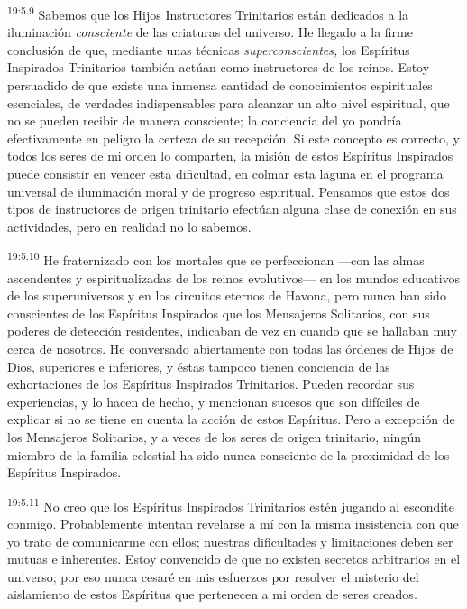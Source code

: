 \par
\textsuperscript{19:5.9} Sabemos que los Hijos Instructores Trinitarios están dedicados a la iluminación \textit{consciente} de las criaturas del universo. He llegado a la firme conclusión de que, mediante unas técnicas \textit{superconscientes,} los Espíritus Inspirados Trinitarios también actúan como instructores de los reinos. Estoy persuadido de que existe una inmensa cantidad de conocimientos espirituales esenciales, de verdades indispensables para alcanzar un alto nivel espiritual, que no se pueden recibir de manera consciente; la conciencia del yo pondría efectivamente en peligro la certeza de su recepción. Si este concepto es correcto, y todos los seres de mi orden lo comparten, la misión de estos Espíritus Inspirados puede consistir en vencer esta dificultad, en colmar esta laguna en el programa universal de iluminación moral y de progreso espiritual. Pensamos que estos dos tipos de instructores de origen trinitario efectúan alguna clase de conexión en sus actividades, pero en realidad no lo sabemos.

\par
\textsuperscript{19:5.10} He fraternizado con los mortales que se perfeccionan ---con las almas ascendentes y espiritualizadas de los reinos evolutivos--- en los mundos educativos de los superuniversos y en los circuitos eternos de Havona, pero nunca han sido conscientes de los Espíritus Inspirados que los Mensajeros Solitarios, con sus poderes de detección residentes, indicaban de vez en cuando que se hallaban muy cerca de nosotros. He conversado abiertamente con todas las órdenes de Hijos de Dios, superiores e inferiores, y éstas tampoco tienen conciencia de las exhortaciones de los Espíritus Inspirados Trinitarios. Pueden recordar sus experiencias, y lo hacen de hecho, y mencionan sucesos que son difíciles de explicar si no se tiene en cuenta la acción de estos Espíritus. Pero a excepción de los Mensajeros Solitarios, y a veces de los seres de origen trinitario, ningún miembro de la familia celestial ha sido nunca consciente de la proximidad de los Espíritus Inspirados.

\par
\textsuperscript{19:5.11} No creo que los Espíritus Inspirados Trinitarios estén jugando al escondite conmigo. Probablemente intentan revelarse a mí con la misma insistencia con que yo trato de comunicarme con ellos; nuestras dificultades y limitaciones deben ser mutuas e inherentes. Estoy convencido de que no existen secretos arbitrarios en el universo; por eso nunca cesaré en mis esfuerzos por resolver el misterio del aislamiento de estos Espíritus que pertenecen a mi orden de seres creados.


